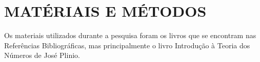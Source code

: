 \chapter{MATÉRIAIS E MÉTODOS}
\label{chap:materiais-metodos}

Os materiais utilizados durante a pesquisa foram os livros que se encontram nas Referências Bibliográficas, mas principalmente o livro Introdução à Teoria dos Números de José Plinio.
